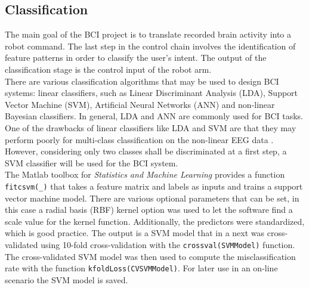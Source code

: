 \documentclass[a4paper,oneside, openright,12pt]{report}
\begin{document}
\subsection{Classification}
The main goal of the BCI project is to translate recorded brain activity into a robot command. The last step in the control chain involves the identification of feature patterns in order to classify the user's intent. The output of the classification stage is the control input of the robot arm.\\
There are various classification algorithms that may be used to design BCI systems: linear classifiers, such as Linear Discriminant Analysis (LDA), Support Vector Machine (SVM), Artificial Neural Networks (ANN) and non-linear Bayesian classifiers. In general, LDA and ANN are commonly used for BCI tasks. One of the drawbacks of linear classifiers like LDA and SVM are that they may perform poorly for multi-class classification on the non-linear EEG data \cite{sivakamianalysis}. However, considering only two classes shall be discriminated at a first step, a SVM classifier will be used for the BCI system.\\
The Matlab toolbox for \textit{Statistics and Machine Learning} provides a function \texttt{fitcsvm(\_)} that takes a feature matrix and labels as inputs and trains a support vector machine model. There are various optional parameters that can be set, in this case a radial basis (RBF) kernel option was used to let the software find a scale value for the kernel function. Additionally, the predictors were standardized, which is good practice. The output is a SVM model that in a next was cross-validated using 10-fold cross-validation with the \texttt{crossval(SVMModel)} function. The cross-validated SVM model was then used to compute the misclassification rate with the function \texttt{kfoldLoss(CVSVMModel)}. For later use in an on-line scenario the SVM model is saved.
\end{document}
